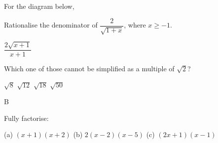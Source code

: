 \documentclass{source/quiz-exam}
\begin{document}
\begin{questions}
\question For the diagram below, \droptotalpoints


\question[2] Rationalise the denominator of $\dfrac{2}{\sqrt{1+x}}$, where $x \ge -1$. \droppoints
\begin{answer}
$\dfrac{2 \sqrt{x+1}}{x+1}$
\end{answer}
\vspace{1cm}

\question Which one of those cannot be simplified as a multiple of $\sqrt{2}$?
\begin{choices}
    \choice $\sqrt{8}$
    \choice $\sqrt{12}$
    \choice $\sqrt{18}$
    \choice $\sqrt{50}$
\end{choices}
\begin{answer}
B
\end{answer}
\vspace{1cm}

\question Fully factorise: \droptotalpoints
{}
\begin{answer}
(a) $(x+1)(x+2)$
(b) $2(x-2)(x-5)$
(c) $(2x+1)(x-1)$
\end{answer}

\end{questions}
\vfill{}
\showallanswers

\end{document}

